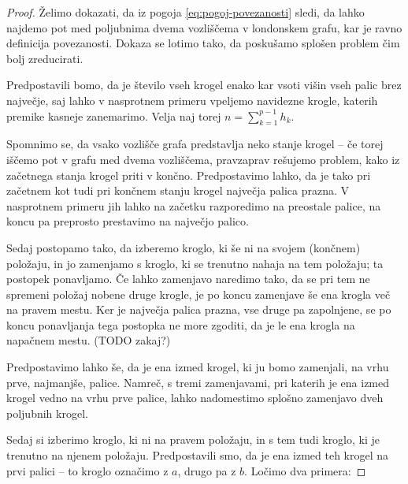 \documentclass[11pt,a4paper]{article}
\theoremstyle{definition} %
\theoremstyle{plain} %
\begin{document}
\begin{proof}
    Želimo dokazati, da iz pogoja \eqref{eq:pogoj-povezanosti} sledi, da lahko najdemo pot med poljubnima dvema vozliščema v londonskem grafu, kar je ravno definicija povezanosti. Dokaza se lotimo tako, da poskušamo splošen problem čim bolj zreducirati.
    
    Predpostavili bomo, da je število vseh krogel enako kar vsoti višin vseh palic brez največje, saj lahko v nasprotnem primeru vpeljemo navidezne krogle, katerih premike kasneje zanemarimo. Velja naj torej $n = \sum_{k=1}^{p-1}h_k$.
    
    Spomnimo se, da vsako vozlišče grafa predstavlja neko stanje krogel -- če torej iščemo pot v grafu med dvema vozliščema, pravzaprav rešujemo problem, kako iz začetnega stanja krogel priti v končno. Predpostavimo lahko, da je tako pri začetnem kot tudi pri končnem stanju krogel največja palica prazna. V nasprotnem primeru jih lahko na začetku razporedimo na preostale palice, na koncu pa preprosto prestavimo na največjo palico.
    
    Sedaj postopamo tako, da izberemo kroglo, ki še ni na svojem (končnem) položaju, in jo zamenjamo s kroglo, ki se trenutno nahaja na tem položaju; ta postopek ponavljamo. Če lahko zamenjavo naredimo tako, da se pri tem ne spremeni položaj nobene druge krogle, je po koncu zamenjave še ena krogla več na pravem mestu.
    Ker je največja palica prazna, vse druge pa zapolnjene, se po koncu ponavljanja tega postopka ne more zgoditi, da je le ena krogla na napačnem mestu. (TODO zakaj?)
    
    Predpostavimo lahko še, da je ena izmed krogel, ki ju bomo zamenjali, na vrhu prve, najmanjše, palice. Namreč, s tremi zamenjavami, pri katerih je ena izmed krogel vedno na vrhu prve palice, lahko nadomestimo splošno zamenjavo dveh poljubnih krogel.
    
    Sedaj si izberimo kroglo, ki ni na pravem položaju, in s tem tudi kroglo, ki je trenutno na njenem položaju. Predpostavili smo, da je ena izmed teh krogel na prvi palici -- to kroglo označimo z $a$, drugo pa z $b$. Ločimo dva primera:
    

\end{proof}
\end{document}
